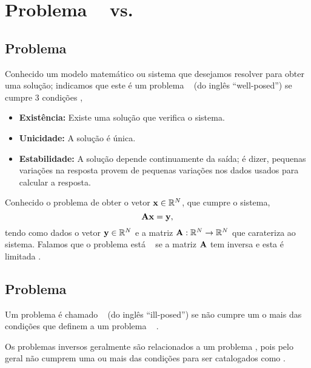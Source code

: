 \section{Problema \wellposed~ vs. \illposed }

\subsection{Problema \wellposed}
\begin{definition}
\label{def:bem-posto:1}
Conhecido um modelo matemático ou sistema que desejamos resolver para obter uma solução;
indicamos que este é um problema \wellposed~ (do inglês ``well-posed'') se cumpre 3 condições \cite[pp. 16]{gockenbach2016linear},
\begin{itemize}
\item \textbf{Existência:} Existe uma solução que verifica o sistema.
\item \textbf{Unicidade:} A solução é única.
\item \textbf{Estabilidade:} A solução depende continuamente da saída;
é dizer, pequenas variações na resposta provem de pequenas variações nos dados usados para calcular a resposta.
\end{itemize}
\end{definition}

\begin{example}
Conhecido o problema de obter o vetor $\VECTOR{x} \in \mathbb{R}^{N}$,
que cumpre o sistema,
\begin{equation}
\MATRIX{A}\VECTOR{x}=\VECTOR{y},
\end{equation}
 tendo como dados o vetor $\VECTOR{y} \in \mathbb{R}^{N}$ e 
a matriz $\MATRIX{A}: \mathbb{R}^{N} \rightarrow \mathbb{R}^{N}$ que carateriza ao sistema.
Falamos que o problema está \wellposed~ se a matriz $\MATRIX{A}$ tem inversa e esta é limitada \cite[pp. 18]{gockenbach2016linear}. 
\end{example}

\subsection{Problema \illposed}
\begin{definition}
\label{def:mal-posto:1}
Um problema é chamado \illposed~ (do inglês ``ill-posed'') se não cumpre um o mais das condições que definem a um problema 
\wellposed~ \cite[pp. 18]{gockenbach2016linear}.

Os problemas inversos geralmente são relacionados a um problema \illposed,
pois pelo geral não cumprem uma ou mais das condições para ser catalogados como \wellposed. 
\end{definition}

